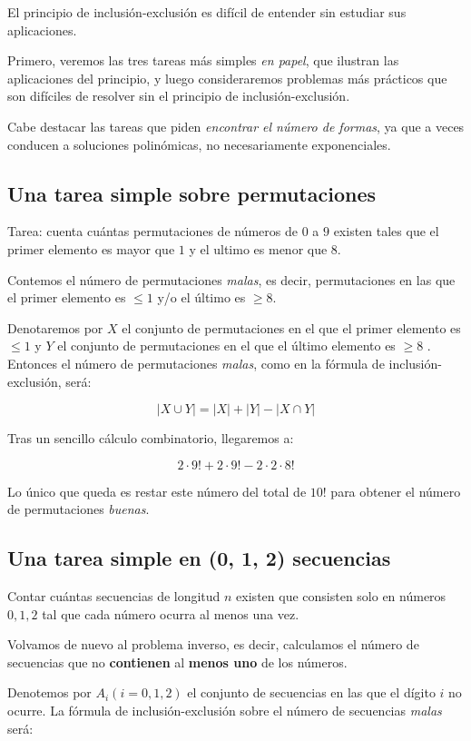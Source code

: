 El principio de inclusión-exclusión es difícil de entender sin estudiar sus aplicaciones.

Primero, veremos las tres tareas más simples \emph{en papel}, que ilustran las aplicaciones del principio, y luego consideraremos problemas más prácticos que son difíciles de resolver sin el principio de inclusión-exclusión.

Cabe destacar las tareas que piden \emph{encontrar el número de formas}, ya que a veces conducen a soluciones polinómicas, no necesariamente exponenciales.

\subsection{Una tarea simple sobre permutaciones}

Tarea: cuenta cuántas permutaciones de números de $0$ a $9$ existen tales que el primer elemento es mayor que $1$ y el ultimo es menor que $8$.

Contemos el número de permutaciones \emph{malas}, es decir, permutaciones en las que el primer elemento es $\leq 1$ y/o el último es $\geq 8$.

Denotaremos por $X$ el conjunto de permutaciones en el que el primer elemento es $\leq 1$ y $Y$ el conjunto de permutaciones en el que el último elemento es $\geq 8$ . Entonces el número de permutaciones \emph{malas}, como en la fórmula de inclusión-exclusión, será:

$$|X \cup Y| = |X| + |Y| - |X \cap Y|$$

Tras un sencillo cálculo combinatorio, llegaremos a:

$$2 \cdot 9! + 2 \cdot 9! - 2 \cdot 2 \cdot 8!$$

Lo único que queda es restar este número del total de $10!$ para obtener el número de permutaciones \emph{buenas}.

\subsection{Una tarea simple en (0, 1, 2) secuencias}

Contar cuántas secuencias de longitud $n$ existen que consisten solo en números $0,1,2$ tal que cada número ocurra al menos una vez.

Volvamos de nuevo al problema inverso, es decir, calculamos el número de secuencias que no \textbf{contienen} al \textbf{menos uno} de los números.

Denotemos por $A_i (i = 0,1,2)$ el conjunto de secuencias en las que el dígito $i$ no ocurre. La fórmula de inclusión-exclusión sobre el número de secuencias \emph{malas} será:

